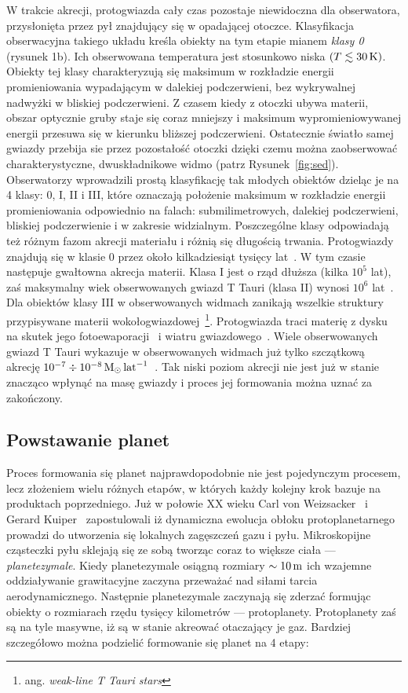 W trakcie akrecji, protogwiazda cały czas pozostaje niewidoczna dla obserwatora,
przysłonięta przez pył znajdujący się w opadającej otoczce. Klasyfikacja
obserwacyjna takiego układu kreśla obiekty na tym etapie mianem \emph{klasy
0}~\cite{andre} (rysunek 1b). Ich obserwowana temperatura jest stosunkowo niska
$(T \lesssim 30\hbox{$\thinspace\textrm{K}$})$. Obiekty tej klasy charakteryzują się maksimum w rozkładzie
energii promieniowania wypadającym w dalekiej podczerwieni, bez wykrywalnej
nadwyżki w bliskiej podczerwieni. Z czasem kiedy z otoczki ubywa materii,
obszar optycznie gruby staje się coraz mniejszy i maksimum wypromieniowywanej
energii przesuwa się w kierunku bliższej podczerwieni. Ostatecznie
światło samej gwiazdy przebija sie przez pozostałość otoczki dzięki czemu można
zaobserwować charakterystyczne, dwuskładnikowe widmo (patrz
Rysunek~\ref{fig:sed}). Obserwatorzy wprowadzili prostą klasyfikację tak młodych
obiektów dzieląc je na 4 klasy: 0, I, II i III, które oznaczają położenie
maksimum w rozkładzie energii promieniowania odpowiednio na falach:
submilimetrowych, dalekiej podczerwieni, bliskiej podczerwienie i w zakresie
widzialnym. Poszczególne klasy odpowiadają też różnym fazom akrecji materiału i
różnią się długością trwania. Protogwiazdy znajdują się w klasie 0 przez około
kilkadziesiąt tysięcy lat~\cite{FSSK06}. W tym czasie następuje gwałtowna
akrecja materii.  Klasa I jest o rząd dłuższa (kilka $10^5$ lat), zaś maksymalny
wiek obserwowanych gwiazd T Tauri (klasa II) wynosi $10^6$ lat~\cite{HCGD98}.
Dla obiektów klasy III w obserwowanych widmach zanikają wszelkie struktury
przypisywane materii wokołogwiazdowej~\footnote{ang. \emph{weak-line T Tauri
stars}}. Protogwiazda traci materię z dysku na skutek jego
fotoewaporacji~\cite{ACP06} i wiatru gwiazdowego~\cite{PN86}. Wiele
obserwowanych gwiazd T Tauri wykazuje w obserwowanych widmach już tylko
szczątkową akrecję $10^{-7} \div 10^{-8} \hbox{$\mathrm{\thinspace M_{\odot}}$}\hbox{$\thinspace\textrm{lat}$}^{-1}$~\cite{Hart98}. Tak niski
poziom akrecji nie jest już w stanie znacząco wpłynąć na masę gwiazdy i proces
jej formowania można uznać za zakończony.

\subsection{Powstawanie planet}

Proces formowania się planet najprawdopodobnie nie jest pojedynczym procesem,
lecz złożeniem wielu różnych etapów, w których każdy kolejny krok bazuje na
produktach poprzedniego. Już w połowie XX wieku Carl von
Weizsacker~\cite*{1943ZA.....22..319W} i Gerard
Kuiper~\cite*{1951PNAS...37....1K} zapostulowali iż dynamiczna ewolucja obłoku
protoplanetarnego prowadzi do utworzenia się lokalnych zagęszczeń gazu i pyłu.
Mikroskopijne cząsteczki pyłu sklejają się ze sobą tworząc coraz to większe
ciała --- \emph{planetezymale}. Kiedy planetezymale osiągną rozmiary $\sim 10\hbox{$\thinspace\textrm{m}$}$
ich wzajemne oddziaływanie grawitacyjne zaczyna przeważać nad siłami tarcia
aerodynamicznego. Następnie planetezymale zaczynają się zderzać formując obiekty
o rozmiarach rzędu tysięcy kilometrów --- protoplanety. Protoplanety zaś są na
tyle masywne, iż są w stanie akreować otaczający je gaz. Bardziej szczegółowo
można podzielić formowanie się planet na 4 etapy:

